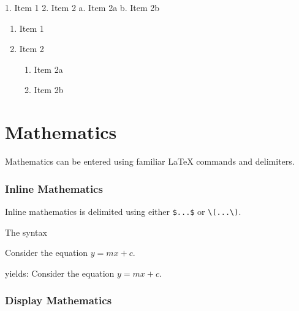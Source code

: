 \documentclass[
  letterpaper,
  oneside]{book}
\newenvironment{Shaded}{\begin{snugshade}}{\end{snugshade}}
\newcommand{\NormalTok}[1]{\textcolor[rgb]{0.00,0.23,0.31}{#1}}
\newcommand{\SpecialStringTok}[1]{\textcolor[rgb]{0.13,0.47,0.30}{#1}}
\providecommand{\tightlist}{%
  \setlength{\itemsep}{0pt}\setlength{\parskip}{0pt}}\usepackage{longtable,booktabs,array}
\numberwithin{equation}{section}
\numberwithin{figure}{section}
\theoremstyle{break}
\theoremstyle{plain}
\theoremstyle{remark}
\begin{document}
\begin{Shaded}
\begin{Highlighting}[]
\SpecialStringTok{1. }\NormalTok{Item 1}
\SpecialStringTok{2. }\NormalTok{Item 2}
\NormalTok{    a. Item 2a}
\NormalTok{    b. Item 2b}
\end{Highlighting}
\end{Shaded}

\begin{enumerate}
\def\labelenumi{\arabic{enumi}.}
\tightlist
\item
  Item 1
\item
  Item 2

  \begin{enumerate}
  \def\labelenumii{\alph{enumii}.}
  \tightlist
  \item
    Item 2a
  \item
    Item 2b
  \end{enumerate}
\end{enumerate}

\section{Mathematics}\label{mathematics}

Mathematics can be entered using familiar LaTeX commands and delimiters.

\subsubsection*{Inline Mathematics}\label{inline-mathematics}

Inline mathematics is delimited using either \texttt{\$...\$} or
\texttt{\textbackslash{}(...\textbackslash{})}.

The syntax

\begin{Shaded}
\begin{Highlighting}[]
\NormalTok{Consider the equation $y = mx+c$.}
\end{Highlighting}
\end{Shaded}

yields: Consider the equation \(y = mx+c\).

\subsubsection*{Display Mathematics}\label{display-mathematics}
\end{document}
